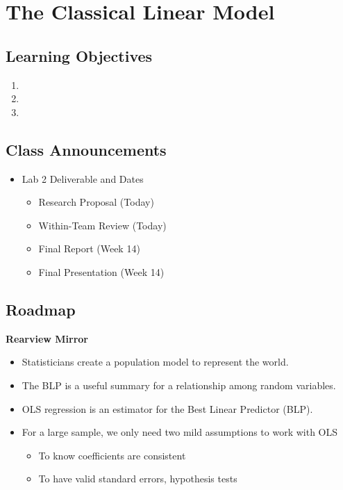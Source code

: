 \documentclass[
]{book}
\providecommand{\tightlist}{%
  \setlength{\itemsep}{0pt}\setlength{\parskip}{0pt}}
\theoremstyle{definition}
\theoremstyle{definition}
\theoremstyle{definition}
\theoremstyle{definition}
\theoremstyle{remark}
\begin{document}
\hypertarget{the-classical-linear-model}{%
\chapter{The Classical Linear Model}\label{the-classical-linear-model}}

\hypertarget{learning-objectives-11}{%
\section{Learning Objectives}\label{learning-objectives-11}}

\begin{enumerate}
\def\labelenumi{\arabic{enumi}.}
\tightlist
\item
\item
\item
\end{enumerate}

\hypertarget{class-announcements-10}{%
\section{Class Announcements}\label{class-announcements-10}}

\begin{itemize}
\tightlist
\item
  Lab 2 Deliverable and Dates

  \begin{itemize}
  \tightlist
  \item
    Research Proposal (Today)
  \item
    Within-Team Review (Today)
  \item
    Final Report (Week 14)
  \item
    Final Presentation (Week 14)
  \end{itemize}
\end{itemize}

\hypertarget{roadmap-9}{%
\section{Roadmap}\label{roadmap-9}}

\textbf{Rearview Mirror}

\begin{itemize}
\tightlist
\item
  Statisticians create a population model to represent the world.
\item
  The BLP is a useful summary for a relationship among random variables.
\item
  OLS regression is an estimator for the Best Linear Predictor (BLP).
\item
  For a large sample, we only need two mild assumptions to work with OLS

  \begin{itemize}
  \tightlist
  \item
    To know coefficients are consistent
  \item
    To have valid standard errors, hypothesis tests
  \end{itemize}
\end{itemize}
\end{document}
